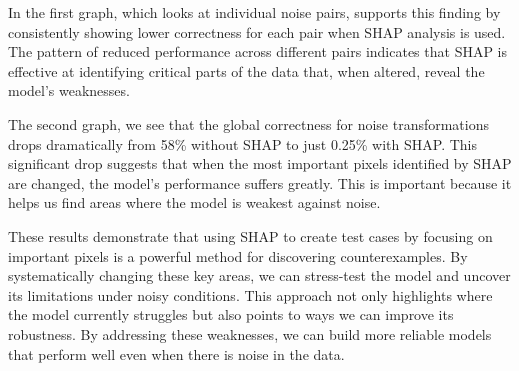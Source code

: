 In the first graph, which looks at individual noise pairs, supports this finding by consistently showing lower correctness for each pair when SHAP analysis is used. The pattern of reduced performance across different pairs indicates that SHAP is effective at identifying critical parts of the data that, when altered, reveal the model's weaknesses.

The second graph, we see that the global correctness for noise transformations drops dramatically from 58\% without SHAP to just 0.25\% with SHAP. This significant drop suggests that when the most important pixels identified by SHAP are changed, the model's performance suffers greatly. This is important because it helps us find areas where the model is weakest against noise.

These results demonstrate that using SHAP to create test cases by focusing on important pixels is a powerful method for discovering counterexamples. By systematically changing these key areas, we can stress-test the model and uncover its limitations under noisy conditions. This approach not only highlights where the model currently struggles but also points to ways we can improve its robustness. By addressing these weaknesses, we can build more reliable models that perform well even when there is noise in the data.

